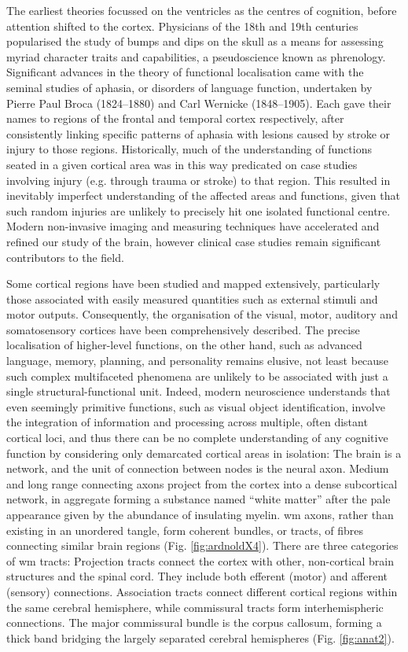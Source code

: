 The earliest theories focussed on the ventricles as the centres of cognition, before attention shifted to the cortex\autocite{Folzenlogen2019}.
Physicians of the 18th and 19th centuries popularised the study of bumps and dips on the skull as a means for assessing myriad character traits and capabilities, a pseudoscience known as phrenology.
Significant advances in the theory of functional localisation came with the seminal studies of aphasia, or disorders of language function, undertaken by Pierre Paul Broca (1824--1880) and Carl Wernicke (1848--1905).
Each gave their names to regions of the frontal and temporal cortex respectively, after consistently linking specific patterns of aphasia with lesions caused by stroke or injury to those regions.
Historically, much of the understanding of functions seated in a given cortical area was in this way predicated on case studies involving injury (e.g. through trauma or stroke) to that region.
This resulted in inevitably imperfect understanding of the affected areas and functions, given that such random injuries are unlikely to precisely hit one isolated functional centre.
Modern non-invasive imaging and measuring techniques have accelerated and refined our study of the brain, however clinical case studies remain significant contributors to the field.

Some cortical regions have been studied and mapped extensively, particularly those associated with easily measured quantities such as external stimuli and motor outputs.
Consequently, the organisation of the visual, motor, auditory and somatosensory cortices have been comprehensively described.
The precise localisation of higher-level functions, on the other hand, such as advanced language, memory, planning, and personality remains elusive, not least because such complex multifaceted phenomena are unlikely to be associated with just a single structural-functional unit\autocite{Catani2007}.
Indeed, modern neuroscience understands that even seemingly primitive functions, such as visual object identification, involve the integration of information and processing across multiple, often distant cortical loci\autocite{ffytche2005}, and thus there can be no complete understanding of any cognitive function by considering only demarcated cortical areas in isolation:
The brain is a network, and the unit of connection between nodes is the neural axon.
Medium and long range connecting axons project from the cortex into a dense subcortical network, in aggregate forming a substance named ``white matter'' after the pale appearance given by the abundance of insulating myelin.
\Gls{wm} axons, rather than existing in an unordered tangle, form coherent bundles, or tracts, of fibres connecting similar brain regions (Fig. \ref{fig:ardnoldX4}).
There are three categories of \gls{wm} tracts:
Projection tracts connect the cortex with other, non-cortical brain structures and the spinal cord.
They include both efferent (motor) and afferent (sensory) connections.
Association tracts connect different cortical regions within the same cerebral hemisphere, while commissural tracts form interhemispheric connections.
The major commissural bundle is the corpus callosum, forming a thick band bridging the largely separated cerebral hemispheres (Fig. \ref{fig:anat2}).

